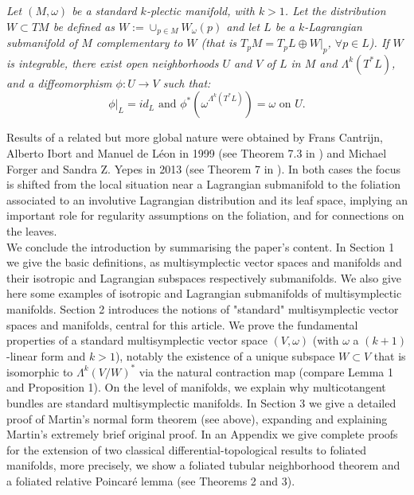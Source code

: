 \documentclass[a4paper,12pt,leqno]{article}
\begin{document}
 {\it Let $(M,\omega)$ be a standard $k$-plectic manifold, with $k>1$. Let the
distribution $W\subset TM$ be defined as  $W:=\cup_{p\in M} W_{\omega}(p)$ and let $L$ be a $k$-Lagrangian 
submanifold of $M$ complementary to $W$ (that is $T_pM=T_pL\oplus W|_p$, $\forall p\in L$).
If $W$ is integrable, there exist open neighborhoods $U$ and $V$ of $L$ in $M$ 
and $\Lambda^k(T^{*}L)$, and a diffeomorphism $\phi:U\rightarrow V$ such that:
\begin{equation*}
\phi|_{L}=id_{L}   \,\, \mbox{and} \,\,  \phi^{*}(\omega^{\Lambda^k(T^{*}L)})=\omega \,\,  \mbox{on} \,\, U.
\end{equation*}  }


Results of a related but more global nature were obtained by Frans Cantrijn, Alberto Ibort and Manuel de L\'eon in 1999
(see Theorem 7.3 in \cite{cil1999}) and Michael Forger and Sandra Z. Yepes in 2013 (see Theorem 7 in  \cite{Forger:2012pr}). In both 
cases the focus is shifted from the local situation near a Lagrangian submanifold to the foliation associated to an involutive Lagrangian 
distribution and its leaf space, implying an important role for regularity assumptions on the foliation, and for connections on the leaves.\\

We conclude the introduction by summarising the paper's content. In Section 1 we give the basic definitions, as multisymplectic vector 
spaces and manifolds and their isotropic and Lagrangian subspaces respectively submanifolds. We also give here some examples of 
isotropic and Lagrangian submanifolds of multisymplectic manifolds. Section 2 introduces the notions of "standard" multisymplectic 
vector spaces and manifolds, central for this article. We prove the fundamental properties of a standard multisymplectic vector space
$(V,\omega)$ (with $\omega$ a $(k{+}1)$-linear form and $k>1$), notably the existence of a unique subspace $W\subset V$ that is 
isomorphic to  $\Lambda^k (V/W)^*$ via the natural contraction map (compare Lemma 1 and Proposition 1). On the level of manifolds, we 
explain why multicotangent bundles are standard multisymplectic manifolds. In Section 3 we give a detailed proof of Martin's normal form theorem 
(see above), expanding and explaining Martin's extremely brief original proof. In an Appendix we give complete proofs for the extension of 
two classical differential-topological results to foliated manifolds, more precisely, we show a foliated tubular neighborhood theorem and a foliated relative 
Poincar\'e lemma (see Theorems 2 and 3).\\
\end{document}
